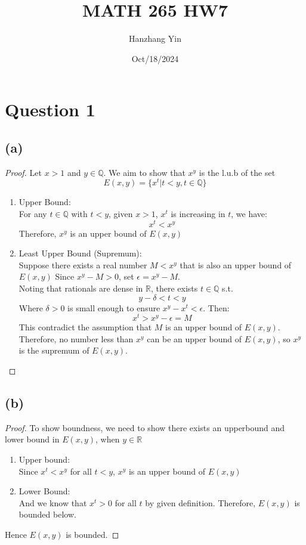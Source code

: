 \documentclass{article}
\title{MATH 265 HW7}
\author{Hanzhang Yin}
\date{Oct/18/2024}
\begin{document}
\maketitle

\section*{Question 1}

\subsection*{(a)}
\begin{proof}
    Let $x > 1$ and $y \in \mathbb{Q}$. We aim to show that $x^y$ is the l.u.b of the set
    \[ E(x, y) = \{ x^t | t < y, t \in \mathbb{Q} \} \]
    \begin{enumerate}
        \item Upper Bound: 
        \\
        For any $t \in \mathbb{Q}$ with $t < y$, given $x > 1$, $x^t$ is increasing in $t$, we have:
        \[ x^t < x^y \]
        Therefore, $x^y$ is an upper bound of $E(x, y)$
        \item Least Upper Bound (Supremum): 
        \\
        Suppose there exists a real number $M < x^y$ that is also an upper bound of $E(x,y)$
        Since $x^y - M > 0$, set $\epsilon = x^y - M$.
        \\
        Noting that rationals are dense in $\mathbb{R}$, there exists $t \in \mathbb{Q}$ s.t. 
        \[ y - \delta < t < y \]
        Where $\delta > 0$ is small enough to ensure $x^y - x^t < \epsilon$.
        Then:
        \[ x^t > x^y - \epsilon = M \]
        This contradict the assumption that $M$ is an upper bound of $E(x, y)$.
        Therefore, no number less than $x^y$ can be an upper bound of $E(x,y)$, so $x^y$ is the supremum of $E(x,y)$.
    \end{enumerate}
\end{proof}

\subsection*{(b)}
\begin{proof}
    To show boundness, we need to show there exists an upperbound and lower bound in $E(x,y)$, when $y \in \mathbb{R}$
    \\
    \begin{enumerate}
        \item Upper bound: 
        \\
        Since $x^t < x^y$ for all $t < y$, $x^y$ is an upper bound of $E(x,y)$
        \item Lower Bound:
        \\
        And we know that $x^t > 0$ for all $t$ by given definition. Therefore, $E(x,y)$ is bounded below.
    \end{enumerate}
    Hence $E(x, y)$ is bounded.
\end{proof}
\end{document}
